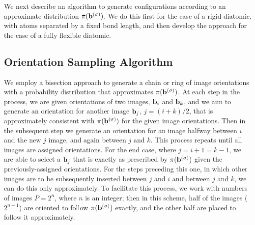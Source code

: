         We next describe an algorithm to generate configurations according to an approximate distribution $\tilde\pi({\mathbf {b}}^{(\sigma)})$. We do this first for the case of a rigid diatomic, with atoms separated by a fixed bond length, and then develop the approach for the case of a fully flexible diatomic.
    \subsection{Orientation Sampling Algorithm}
    \label{subsec:orMove}
        We employ a bisection approach to generate a chain or ring of image orientations with a probability distribution that approximates $\pi({\mathbf {b}}^{(\sigma)})$. At each step in the process, we are given orientations of two images, ${\mathbf {b}}_i$ and ${\mathbf {b}}_k$, and we aim to generate an orientation for another image ${\mathbf {b}}_j$, $j = (i+k)/2$, that is approximately consistent with $\pi({\mathbf {b}}^{(\sigma)})$ for the given image orientations. Then in the subsequent step we generate an orientation for an image halfway between $i$ and the new $j$ image, and again between $j$ and $k$. This process repeats until all images are assigned orientations. For the end case, where $j = i+1 = k-1$, we are able to select a ${\mathbf {b}}_j$ that is exactly as prescribed by $\pi({\mathbf {b}}^{(\sigma)})$ given the previously-assigned orientations. For the steps preceding this one, in which other images are to be subsequently inserted between $j$ and $i$ and between $j$ and $k$, we can do this only approximately. To facilitate this process, we work with numbers of images $P = 2^n$, where $n$ is an integer; then in this scheme, half of the images ($2^{n-1}$) are oriented to follow $\pi({\mathbf {b}}^{(\sigma)})$ exactly, and the other half are placed to follow it approximately.

